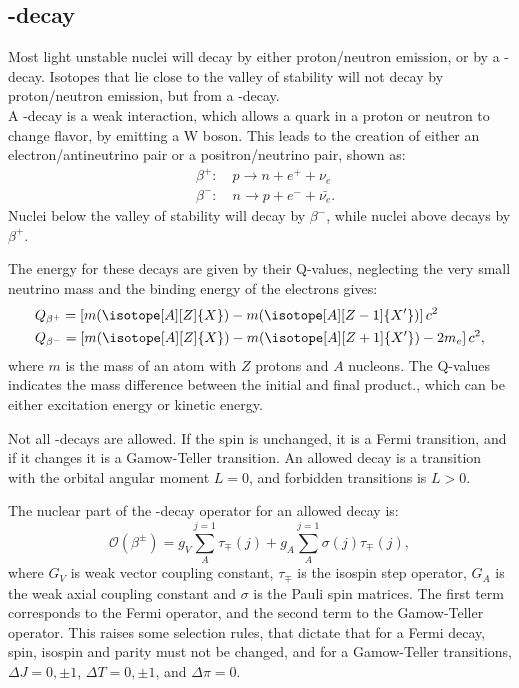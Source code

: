 
\subsection{\be-decay}
Most light unstable nuclei will decay by either proton/neutron emission, or by a \be-decay. Isotopes that lie close to the valley of stability will not decay by proton/neutron emission, but from a \be-decay.
\\
A \be-decay is a weak interaction, which allows a quark in a proton or neutron to change flavor, by emitting a W boson. This leads to the creation of either an electron/antineutrino pair or a positron/neutrino pair, shown as:
\begin{align}
&\beta^+:\quad p\rightarrow n + e^+ + \nu_e\\
&\beta^-:\quad n\rightarrow p + e^- + \bar{\nu_e}.
\end{align}
Nuclei below the valley of stability will decay by $\beta^-$, while nuclei above decays by $\beta ^+$.

The energy for these decays are given by their Q-values, neglecting the very small neutrino mass and the binding energy of the electrons gives:
\begin{align}
&Q_{\beta^+} = \left[ m (\isotope[A][Z]{X}) - m(\isotope[A][Z-1]{X'})  		 \right] c^2\\
&Q_{\beta^-} = \left[ m (\isotope[A][Z]{X}) - m(\isotope[A][Z+1]{X'}) -2m_e  \right] c^2,
\end{align}
where $m$ is the mass of an atom with $Z$ protons and $A$ nucleons.
The Q-values indicates the mass difference between the initial and final product., which can be either excitation energy or kinetic energy. 

Not all \be-decays are allowed. If the spin is unchanged, it is a Fermi transition, and if it changes it is a Gamow-Teller transition. 
An allowed decay is a transition with the orbital angular moment $L = 0$, and forbidden transitions is $L > 0$.

The nuclear part of the \be-decay operator for an allowed decay is:
\begin{equation}
	\mathcal{O} (\beta^\pm) = g_V \sum_{A}^{j=1}\tau_\mp (j) + g_A \sum_{A}^{j=1}\sigma(j)\tau_\mp(j),
\end{equation}
where $G_V$ is weak vector coupling constant, $\tau_\mp$ is the isospin step operator, $G_A$ is the weak axial coupling constant and $\sigma$ is the Pauli spin matrices.
The first term corresponds to the Fermi operator, and the second term to the Gamow-Teller operator. 
This raises some selection rules, that dictate that for a Fermi decay, spin, isospin and parity must not be changed, and for a Gamow-Teller transitions, $\Delta J = 0, \pm1$, $\Delta T = 0, \pm 1$, and $\Delta \pi = 0$.


